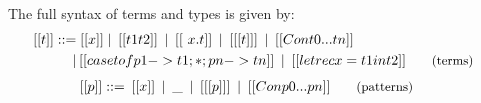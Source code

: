 The full syntax of terms and types is given by:
\begin{align*}
   \hspace{-0.9em}
   [[ t ]] ::= & \;
   [[ x ]]
   \mid \hspace{0.2em}[[ t1 t2 ]]
   \hspace{0.2em}\mid \hspace{0.2em}[[ \ x . t ]] 
   \hspace{0.2em}\mid \hspace{0.2em}[[ [ t ] ]] 
   \hspace{0.2em}\mid \hspace{0.2em}[[ Con t0 ... tn ]] \\
   \hspace{0.2em}\mid & \hspace{0.2em}[[ case t of p1 -> t1 ; * ; pn -> tn  ]] 
   \hspace{0.2em}\mid \hspace{0.2em}[[ letrec x = t1 in t2]]
 {\small{\tag{terms}}}
\end{align*}
\begin{align*}
   \hspace{-0.9em}
   [[ p ]] ::= & \;
   \hspace{0.2em} [[ x ]]
   \hspace{0.2em} \mid \hspace{0.2em} \_
   \hspace{0.2em }\mid \hspace{0.2em} [[ [ p ] ]]
   \hspace{0.2em} \mid \hspace{0.2em} [[ Con p0 ... pn ]]
{\small{\tag{patterns}}}
\end{align*}

